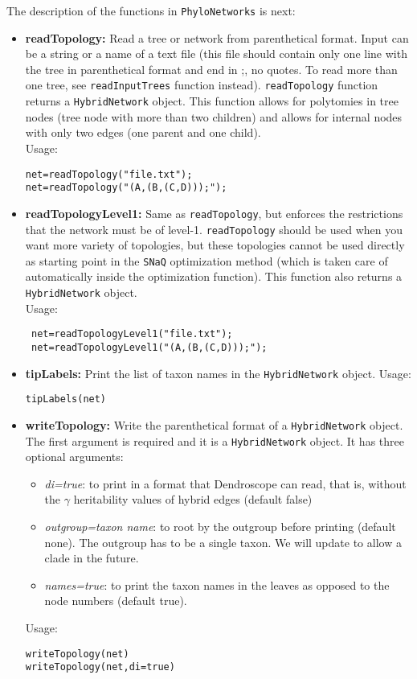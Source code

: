 \documentclass[12pt]{article}
\begin{document}
The description of the
functions in \texttt{PhyloNetworks} is next:
\begin{itemize}
\item \textbf{readTopology:} Read a tree or network from
  parenthetical format. Input can be a string or a name of a text file
  (this file should contain only one line with the tree in
  parenthetical format and end in ;, no quotes. To read more than one
  tree, see \texttt{readInputTrees} function
  instead). \texttt{readTopology} function returns a
  \texttt{HybridNetwork} object. This function allows for polytomies
  in tree nodes (tree node with more than two children) and allows for
  internal nodes with only two edges (one parent and one child).
\\Usage:
\begin{lstlisting}
net=readTopology("file.txt");
net=readTopology("(A,(B,(C,D)));");
\end{lstlisting}

\item \textbf{readTopologyLevel1:} Same as \texttt{readTopology}, but
  enforces the restrictions that the network must be of
  level-1. \texttt{readTopology} should be used when you want more
  variety of topologies, but these topologies cannot be used directly
  as starting point in the \texttt{SNaQ} optimization method (which is
  taken care of automatically inside the optimization function). This
  function also returns a \texttt{HybridNetwork} object. \\
  Usage:
\begin{lstlisting}
 net=readTopologyLevel1("file.txt");
 net=readTopologyLevel1("(A,(B,(C,D)));");
\end{lstlisting}


\item \textbf{tipLabels:} Print the list of taxon names in the \texttt{HybridNetwork}
  object.
Usage:
\begin{lstlisting}
tipLabels(net)
\end{lstlisting}

\item \textbf{writeTopology:} Write the parenthetical format of a
  \texttt{HybridNetwork} object. The first argument is required and it
  is a \texttt{HybridNetwork} object. It has three optional arguments:
\begin{itemize}
\item{\textit{di=true}: to print in a format that Dendroscope can
    read, that is, without the $\gamma$ heritability values of hybrid
    edges (default false)}
\item{\textit{outgroup=taxon name}: to root by the outgroup before
    printing (default none). The outgroup has to be a single taxon. We will update to
  allow a clade in the future.}
\item{\textit{names=true}: to print the taxon names in the leaves as opposed to
  the node numbers (default true).}
\end{itemize}
Usage:
\begin{lstlisting}
writeTopology(net)
writeTopology(net,di=true)
\end{lstlisting}


\end{itemize}
\end{document}
